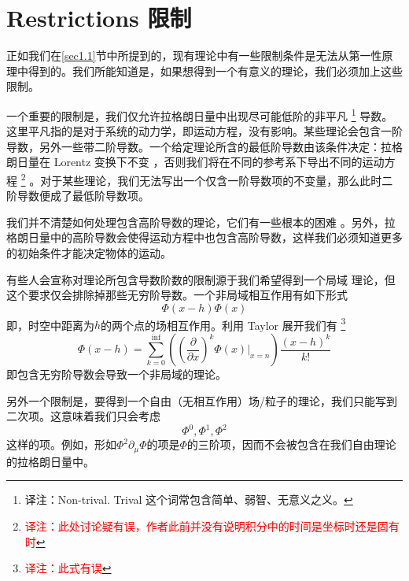 \section{Restrictions 限制}\label{sec4.2}
正如我们在\ref{sec1.1}节中所提到的，现有理论中有一些限制条件是无法从第一性原理中得到的。我们所能知道是，如果想得到一个有意义的理论，我们必须加上这些限制。

一个重要的限制是，我们仅允许拉格朗日量中出现尽可能低阶的非平凡%
\footnote{译注：Non-trival. Trival 这个词常包含简单、弱智、无意义之义。}%
导数。这里平凡指的是对于系统的动力学，即运动方程，没有影响。某些理论会包含一阶导数，另外一些带二阶导数。一个给定理论所含的最低阶导数由该条件决定：拉格朗日量在 Lorentz 变换下不变%
%
，否则我们将在不同的参考系下导出不同的运动方程%
\footnote{\textcolor{red}{译注：此处讨论疑有误，作者此前并没有说明积分中的时间是坐标时还是固有时}}%
。对于某些理论，我们无法写出一个仅含一阶导数项的不变量，那么此时二阶导数便成了最低阶导数项。

我们并不清楚如何处理包含高阶导数的理论，它们有一些根本的困难%
%
。另外，拉格朗日量中的高阶导数会使得运动方程中也包含高阶导数，这样我们必须知道更多的初始条件才能决定物体的运动。

有些人会宣称对理论所包含导数阶数的限制源于我们希望得到一个局域%
%
理论，但这个要求仅会排除掉那些无穷阶导数。一个非局域相互作用有如下形式%
\begin{equation}
\Phi(x-h)\Phi(x)
\end{equation}
即，时空中距离为\(h\)的两个点的场相互作用。利用 Taylor 展开我们有%
\footnote{\textcolor{red}{译注：此式有误}}
\begin{equation}
\Phi(x-h) = \sum\limits_{k=0}^{\inf}\left(\left(\frac{\partial}{\partial x}\right)^k\left.\Phi(x)\right|_{x=n}\right) \frac{(x-h)^k}{k!}
\end{equation}
即包含无穷阶导数会导致一个非局域的理论。

另外一个限制是，要得到一个自由（无相互作用）场/粒子的理论，我们只能写到二次项。这意味着我们只会考虑%
\[
\Phi^0, \Phi^1, \Phi^2
\]
这样的项。例如，形如\(\Phi^2 \partial_\mu \Phi\)的项是\(\Phi\)的三阶项，因而不会被包含在我们自由理论的拉格朗日量中。